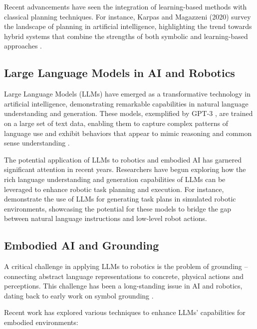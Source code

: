 \documentclass[pdflatex,sn-mathphys-num]{sn-jnl}
\theoremstyle{thmstyleone}
\theoremstyle{thmstyletwo}%
\theoremstyle{thmstylethree}%
\begin{document}
Recent advancements have seen the integration of learning-based methods with classical planning techniques. For instance, Karpas and Magazzeni (2020) survey the landscape of planning in artificial intelligence, highlighting the trend towards hybrid systems that combine the strengths of both symbolic and learning-based approaches \cite{annurev:/content/journals/10.1146/annurev-control-082619-100135}.

\subsection{Large Language Models in AI and Robotics}
Large Language Models (LLMs) have emerged as a transformative technology in artificial intelligence, demonstrating remarkable capabilities in natural language understanding and generation. These models, exemplified by GPT-3 \cite{brown2020languagemodelsfewshotlearners}, are trained on a large set of text data, enabling them to capture complex patterns of language use and exhibit behaviors that appear to mimic reasoning and common sense understanding \cite{naveed2024comprehensive}.

The potential application of LLMs to robotics and embodied AI has garnered significant attention in recent years. Researchers have begun exploring how the rich language understanding and generation capabilities of LLMs can be leveraged to enhance robotic task planning and execution. For instance,\cite{huang2022largelanguagemodelsselfimprove} demonstrate the use of LLMs for generating task plans in simulated robotic environments, showcasing the potential for these models to bridge the gap between natural language instructions and low-level robot actions.

\subsection{Embodied AI and Grounding}
A critical challenge in applying LLMs to robotics is the problem of grounding – connecting abstract language representations to concrete, physical actions and perceptions. This challenge has been a long-standing issue in AI and robotics, dating back to early work on symbol grounding \cite{HARNAD1990335}.

Recent work has explored various techniques to enhance LLMs' capabilities for embodied environments:
\end{document}

